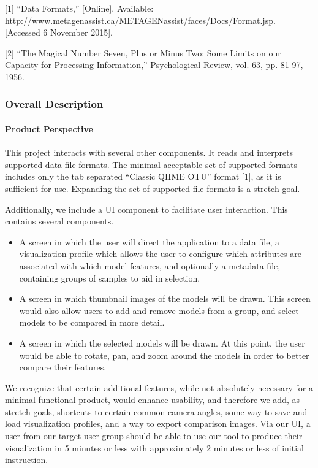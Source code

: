 \documentclass[letterpaper,10pt, onecolumn, draftclsnofoot]{IEEEtran}
\begin{document}
[1] ``Data Formats,'' [Online]. Available: \newline http://www.metagenassist.ca/METAGENassist/faces/Docs/Format.jsp. [Accessed 6 November 2015].

[2] ``The Magical Number Seven, Plus or Minus Two: Some Limits on our Capacity for Processing Information,'' Psychological Review, vol. 63, pp. 81-97, 1956. 

\subsubsection{Overall Description}
\paragraph{Product Perspective}

This project interacts with several other components. It reads and interprets supported data file formats. The minimal acceptable set of supported formats includes only the tab separated ``Classic QIIME OTU'' format [1], as it is sufficient for use. Expanding the set of supported file formats is a stretch goal. 

Additionally, we include a UI component to facilitate user interaction. This contains several components.

\begin{itemize}
	\item A screen in which the user will direct the application to a data file, a visualization profile which allows the user to configure which attributes are associated with which model features, and optionally a metadata file, containing groups of samples to aid in selection.
	\item A screen in which thumbnail images of the models will be drawn. This screen would also allow users to add and remove models from a group, and select models to be compared in more detail.
	\item A screen in which the selected models will be drawn. At this point, the user would be able to rotate, pan, and zoom around the models in order to better compare their features.
\end{itemize}

We recognize that certain additional features, while not absolutely necessary for a minimal functional product, would enhance usability, and therefore we add, as stretch goals, shortcuts to certain common camera angles, some way to save and load visualization profiles, and a way to export comparison images. Via our UI, a user from our target user group should be able to use our tool to produce their visualization in 5 minutes  or less with approximately 2 minutes or less of initial instruction. 
\end{document}
